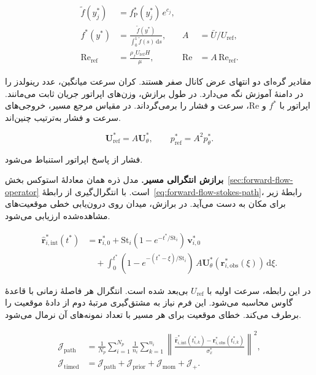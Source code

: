 \begin{equation}
\begin{aligned}
\widetilde f(y_j^*)&= f_{\mathrm P}^*(y_j^*)\,e^{c_j},\\
f^*(y^*)&=\frac{\widetilde f(y^*)}{\int_0^1\widetilde f(s)\,\mathrm ds},
& A&=\bar U/U_{\mathrm{ref}},\\
\mathrm{Re}_{\mathrm{ref}}&=\frac{\rho_f U_{\mathrm{ref}}H}{\mu},
& \mathrm{Re}&=A\,\mathrm{Re}_{\mathrm{ref}} .
\end{aligned}
\label{eq:inverse-flow-parameterization}
\end{equation}

مقادیر گره‌ای دو انتهای عرض کانال صفر هستند.
کران سرعت میانگین، عدد رینولدز را در دامنهٔ آموزش نگه می‌دارد.
در طول برازش، وزن‌های اپراتور جریان ثابت می‌مانند.
اپراتور با $f^*$ و $\mathrm{Re}$، سرعت و فشار را برمی‌گرداند.
در مقیاس مرجع مسیر، خروجی‌های سرعت و فشار به‌ترتیب چنین‌اند.

\[
\mathbf U_{\mathrm{ref}}^*=A\mathbf U_\theta^*,
\qquad
p_{\mathrm{ref}}^*=A^2p_\theta^*.
\]

فشار از پاسخ اپراتور استنباط می‌شود.

\textbf{برازش انتگرالی مسیر.}
مدل ذره همان معادلهٔ استوکس بخش~\ref{sec:forward-flow-operator} است.
با انتگرال‌گیری از رابطهٔ~\eqref{eq:forward-flow-stokes-path}، رابطهٔ زیر برای مکان به دست می‌آید.
در برازش، میدان روی درون‌یابی خطی موقعیت‌های مشاهده‌شده ارزیابی می‌شود.

\begin{equation}
\begin{aligned}
\widehat{\mathbf r}_{i,\mathrm{int}}^*(t^*)
&=\mathbf r_{i,0}^*
 +\mathrm{St}_i(1-e^{-t^*/\mathrm{St}_i})\,\mathbf v_{i,0}^*\\
&\quad+\int_0^{t^*}
  (1-e^{-(t^*-\xi)/\mathrm{St}_i})\,
  A\mathbf U_\theta^*(\mathbf r_{i,\mathrm{obs}}^*(\xi))\,\mathrm d\xi .
\end{aligned}
\label{eq:inverse-flow-integral-path}
\end{equation}

در این رابطه، سرعت اولیه با $U_{\mathrm{ref}}$ بی‌بعد شده است.
انتگرال هر فاصلهٔ زمانی با قاعدهٔ گاوس محاسبه می‌شود.
این فرم نیاز به مشتق‌گیری مرتبهٔ دوم از دادهٔ موقعیت را برطرف می‌کند.
خطای موقعیت برای هر مسیر با تعداد نمونه‌های آن نرمال می‌شود.

\begin{equation}
\begin{aligned}
\mathcal J_{\mathrm{path}}
&=\frac{1}{N_p}\sum_{i=1}^{N_p}\frac{1}{n_i}
\sum_{k=1}^{n_i}
\left\|
\frac{\widehat{\mathbf r}_{i,\mathrm{int}}^*(t_{i,k}^*)
-\mathbf r_{i,\mathrm{obs}}^*(t_{i,k}^*)}{\sigma_x^*}
\right\|^2,\\
\mathcal J_{\mathrm{timed}}
&=\mathcal J_{\mathrm{path}}
+\mathcal J_{\mathrm{prior}}+\mathcal J_{\mathrm{mom}}+\mathcal J_+.
\end{aligned}
\label{eq:inverse-flow-timed-objective}
\end{equation}

